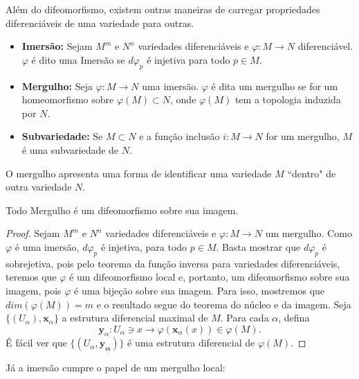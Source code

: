 Além do difeomorfismo, existem outras maneiras de carregar propriedades diferenciáveis de uma variedade para outras.
\begin{definition}
    \label{loc:3.1_:_def_5_:_imersão_e_mergulho.definições}
    \begin{itemize}
        \item \textbf{Imersão:} Sejam $M^m$ e $N^{n}$ variedades diferenciáveis e $\varphi:M\to N$ diferenciável. $\varphi$ é dito uma Imersão se $d\varphi_{p}$ é injetiva para todo $p \in M$.
        \item \textbf{Mergulho:} Seja $\varphi:M\to N$ uma imersão. $\varphi$ é dita um mergulho se for um homeomorfismo sobre $\varphi(M)\subset N$, onde $\varphi(M)$ tem a topologia induzida por $N$.
        \item \textbf{Subvariedade:} Se $M \subset N$ e a função inclusão $i:M\to N$ for um mergulho, $M$ é uma subvariedade de $N$.
    \end{itemize}
\end{definition}
O mergulho apresenta uma forma de identificar uma variedade $M$ ``dentro" de outra variedade $N$.
\begin{proposition}
    \label{loc:3.1_:_def_5_:_imersão_e_mergulho.resultados.proposição_2}
    Todo Mergulho é um difeomorfismo sobre sua imagem.
    \begin{proof}

        Sejam $M^{m}$ e $N^{n}$ variedades diferenciáveis e $\varphi:M\to N$ um mergulho.
        Como $\varphi$ é uma imersão, $d\varphi_{p}$ é injetiva, para todo $p \in M$.
        Basta mostrar que $d\varphi_{p}$ é sobrejetiva, pois pelo teorema da função inversa para variedades diferenciáveis, teremos que $\varphi$ é um difeomorfismo local e, portanto, um difeomorfismo sobre sua imagem, pois $\varphi$ é uma bijeção sobre sua imagem.
        Para isso, mostremos que $dim(\varphi(M)) = m$ e o resultado segue do teorema do núcleo e da imagem.
        Seja $\{ (U_{\alpha}), \mathbf{x}_{\alpha} \}$ a estrutura diferencial maximal de $M$. Para cada $\alpha$, defina
        \begin{equation*}
            \mathbf{y}_{\alpha}:U_{\alpha} \ni x \longrightarrow \varphi(\mathbf{x}_{\alpha}(x)) \in \varphi(M).
        \end{equation*}
        É fácil ver que $\{ (U_{\alpha},\mathbf{y_{\alpha}}) \}$ é uma estrutura diferencial de $\varphi(M)$.
    \end{proof}
\end{proposition}
Já a imersão cumpre o papel de um mergulho local:

